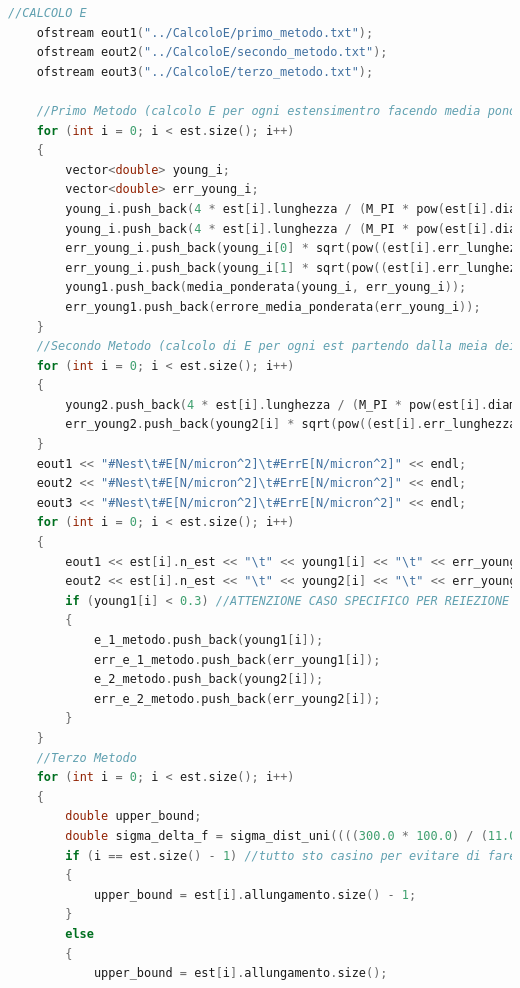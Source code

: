 \documentclass[a4paper,11pt,oneside]{article}
\begin{document}
\begin{lstlisting}[language=C++, label=lst:seconda_parte, caption=seconda\_parte]
	//CALCOLO E
	ofstream eout1("../CalcoloE/primo_metodo.txt");
	ofstream eout2("../CalcoloE/secondo_metodo.txt");
	ofstream eout3("../CalcoloE/terzo_metodo.txt");

	//Primo Metodo (calcolo E per ogni estensimentro facendo media ponderata su E_all e E acc)
	for (int i = 0; i < est.size(); i++)
	{
		vector<double> young_i;
		vector<double> err_young_i;
		young_i.push_back(4 * est[i].lunghezza / (M_PI * pow(est[i].diametro, 2) * est[i].coeff_ango_all));
		young_i.push_back(4 * est[i].lunghezza / (M_PI * pow(est[i].diametro, 2) * est[i].coeff_ango_acc));
		err_young_i.push_back(young_i[0] * sqrt(pow((est[i].err_lunghezza / est[i].lunghezza), 2) + pow((est[i].err_coeff_ango_all / est[i].coeff_ango_all), 2) + 4 * pow((est[i].err_diametro / est[i].diametro), 2))); //CONTROLLARE
		err_young_i.push_back(young_i[1] * sqrt(pow((est[i].err_lunghezza / est[i].lunghezza), 2) + pow((est[i].err_coeff_ango_acc / est[i].coeff_ango_acc), 2) + 4 * pow((est[i].err_diametro / est[i].diametro), 2)));
		young1.push_back(media_ponderata(young_i, err_young_i));
		err_young1.push_back(errore_media_ponderata(err_young_i));
	}
	//Secondo Metodo (calcolo di E per ogni est partendo dalla meia dei K già fatta in Acc e All)
	for (int i = 0; i < est.size(); i++)
	{
		young2.push_back(4 * est[i].lunghezza / (M_PI * pow(est[i].diametro, 2) * est[i].k_medio));
		err_young2.push_back(young2[i] * sqrt(pow((est[i].err_lunghezza / est[i].lunghezza), 2) + pow((est[i].err_k_medio / est[i].k_medio), 2) + 4 * pow((est[i].err_diametro / est[i].diametro), 2)));
	}
	eout1 << "#Nest\t#E[N/micron^2]\t#ErrE[N/micron^2]" << endl;
	eout2 << "#Nest\t#E[N/micron^2]\t#ErrE[N/micron^2]" << endl;
	eout3 << "#Nest\t#E[N/micron^2]\t#ErrE[N/micron^2]" << endl;
	for (int i = 0; i < est.size(); i++)
	{
		eout1 << est[i].n_est << "\t" << young1[i] << "\t" << err_young1[i] << endl;
		eout2 << est[i].n_est << "\t" << young2[i] << "\t" << err_young2[i] << endl;
		if (young1[i] < 0.3) //ATTENZIONE CASO SPECIFICO PER REIEZIONE AD OCCHIO
		{
			e_1_metodo.push_back(young1[i]);
			err_e_1_metodo.push_back(err_young1[i]);
			e_2_metodo.push_back(young2[i]);
			err_e_2_metodo.push_back(err_young2[i]);
		}
	}
	//Terzo Metodo
	for (int i = 0; i < est.size(); i++)
	{
		double upper_bound;
		double sigma_delta_f = sigma_dist_uni((((300.0 * 100.0) / (11.0 * 1000.0)) * (4.0 * 9.806 / 1000.0)), 1.0);
		if (i == est.size() - 1) //tutto sto casino per evitare di fare il k nel campioncino dell ultimo estensimetro
		{
			upper_bound = est[i].allungamento.size() - 1;
		}
		else
		{
			upper_bound = est[i].allungamento.size();

\end{lstlisting}
\end{document}

